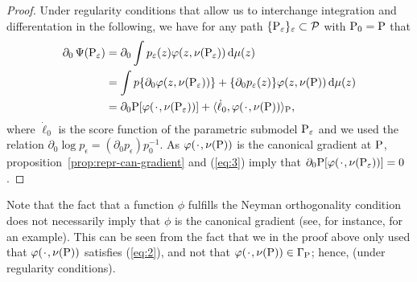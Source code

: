 \documentclass[a4,danish]{article}
\begin{document}
\begin{proof}
  Under regularity conditions that allow us to interchange integration and differentation in the
  following, we have for any  path
  $\{\P_{\epsilon}\}_{\epsilon} \subset \mathcal{P}$ with $\P_0=\P$ that
  \begin{align}
    \label{eq:3}
    \begin{split}
      \partial_0 \TT(\P_{\epsilon})%
      & =\partial_0 \int p_{\epsilon}(z) \phi(z, \nu(\P_{\epsilon})) \diff \mu(z) \\
      & = \int p \{\partial_0  \phi(z, \nu(\P_{\epsilon}))\} +  \{\partial_0 p_{\epsilon}(z)\} \phi(z, \nu(\P)) \diff \mu(z) \\
      & = \partial_0 \P[ \phi(\blank, \nu(\P_{\epsilon}))] +
      \langle \dot{\ell}_0, \phi(\blank, \nu(\P))\rangle_{\P},
    \end{split}
  \end{align}
  where $\dot{\ell}_0$ is the score function of the parametric submodel $\P_{\epsilon}$ and we used
  the relation $\partial_{0}\log p_{\epsilon} = (\partial_{0} p_{\epsilon})p_0^{-1}$. As
  $\phi(\blank, \nu(\P))$ is the canonical gradient at $\P$,
  proposition~\ref{prop:repr-can-gradient} and (\ref{eq:3}) imply that
  $\partial_0 \P[ \phi(\blank, \nu(\P_{\epsilon}))]=0$. 
\end{proof}

\begin{remark}
  Note that the fact that a function $\phi$ fulfills the Neyman
  orthogonality condition does not necessarily imply that $\phi$ is
  the canonical gradient (see, for instance,
  \cite{chernozhukov2016double} for an example). This can be seen from
  the fact that we in the proof above only used that
  $\phi(\blank, \nu(\P))$ satisfies (\ref{eq:2}), and not that
  $\phi(\blank, \nu(\P)) \in \Gamma_{\P}$; hence,  (under regularity
  conditions).
\end{remark}
\end{document}
